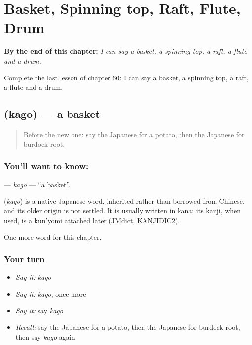 
\chapter{Basket, Spinning top, Raft, Flute, Drum}
\label{ch:ja-basket-spinning-top-raft-flute-drum}

\begin{chapteropening}
\textbf{By the end of this chapter:} \emph{I can say a basket, a spinning top, a raft, a flute and a drum.}

Complete the last lesson of chapter 66: I can say a basket, a spinning top, a raft, a flute and a drum.
\end{chapteropening}

\section[\texorpdfstring{\ja{かご} (kago)}{かご (kago)}]{ (kago) — a basket}

\label{lesson:JA-C66-kago}



\begin{quote}
Before the new one: say the Japanese for a potato, then the Japanese for burdock root.
\end{quote}

\subsection*{You'll want to know: }
\textbf{} — \emph{kago} — \textquotedblleft{}a basket\textquotedblright{}.

\begin{cousinweb}
\textbf{} (\emph{kago}) is a native Japanese word, inherited rather than borrowed from Chinese, and its older origin is not settled. It is usually written in kana; its kanji, when used, is a kun'yomi attached later (JMdict, KANJIDIC2).
\end{cousinweb}

\begin{grammarlens}[title={What you've built}]
One more word for this chapter.
\end{grammarlens}

\subsection*{Your turn}
\begin{itemize}
\raggedright
  \item \emph{Say it:} \emph{kago}
  \item \emph{Say it:} \emph{kago}, once more
  \item \emph{Say it:} say \emph{kago}
  \item \emph{Recall:} say the Japanese for a potato, then the Japanese for burdock root, then say \emph{kago} again
\end{itemize}

